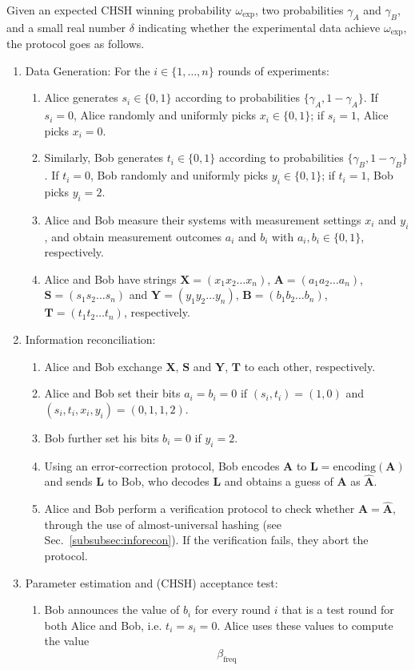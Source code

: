 \documentclass[aps,reprint,showpacs,superscriptaddress]{revtex4-2}
\begin{document}
Given an expected CHSH winning probability $\omega_{\mathrm{exp}}$, two probabilities $\gamma_{A}$ and $\gamma_{B}$, and a small real number $\delta$ indicating whether the experimental data achieve $\omega_{\mathrm{exp}}$, the protocol goes as follows.
\begin{enumerate}
	\item Data Generation:
	For the $i\in\{1,\dots,n\}$ rounds of experiments:
	\begin{enumerate}
		\item Alice generates $s_{i}\in\{0,1\}$ according to probabilities $\{\gamma_{A},1-\gamma_{A}\}$. If $s_{i}=0$, Alice randomly and uniformly picks $x_{i}\in\{0,1\}$; if $s_{i}=1$, Alice picks $x_{i}=0$.
		\item Similarly, Bob generates $t_{i}\in\{0,1\}$ according to probabilities $\{\gamma_{B},1-\gamma_{B}\}$. If $t_{i}=0$, Bob randomly and uniformly picks $y_{i}\in\{0,1\}$; if $t_{i}=1$, Bob picks $y_{i}=2$.
		\item Alice and Bob measure their systems with measurement settings $x_{i}$ and $y_{i}$, and obtain measurement outcomes $a_{i}$ and $b_{i}$ with $a_{i},b_{i}\in\{0,1\}$, respectively.
		\item Alice and Bob have strings $\mathbf{X}=(x_{1}x_{2}\dots x_{n})$, $\mathbf{A}=(a_{1}a_{2}\dots a_{n})$, $\mathbf{S}=(s_{1}s_{2}\dots s_{n})$ and $\mathbf{Y}=(y_{1}y_{2}\dots y_{n})$, $\mathbf{B}=(b_{1}b_{2}\dots b_{n})$,  $\mathbf{T}=(t_{1}t_{2}\dots t_{n})$, respectively.
	\end{enumerate}
	\item Information reconciliation:
	\begin{enumerate}
		\item Alice and Bob exchange $\mathbf{X}$, $\mathbf{S}$ and $\mathbf{Y}$, $\mathbf{T}$ to each other, respectively.
		\item Alice and Bob set their bits $a_{i}=b_{i}=0$ if $(s_{i}, t_{i})=(1,0)$ and $(s_{i},t_{i},x_{i},y_{i})=(0,1,1,2)$.
		\item Bob further set his bits $b_{i}=0$ if $y_{i}=2$.
		\item Using an error-correction protocol, Bob encodes $\mathbf{A}$ to $\mathbf{L}=\mathrm{encoding}(\mathbf{A})$ and sends $\mathbf{L}$ to Bob, who decodes $\mathbf{L}$ and obtains a guess of $\mathbf{A}$ as $\hat{\mathbf{A}}$.
		\item Alice and Bob perform a verification protocol to check whether $\mathbf{A} = \hat{\mathbf{A}}$, through the use of almost-universal hashing (see Sec.~\ref{subsubsec:inforecon}). If the verification fails, they abort the protocol.
	\end{enumerate}
	\item Parameter estimation and (CHSH) acceptance test:
	\begin{enumerate}
		\item Bob announces the value of $b_i$ for every round $i$ that is a test round for both Alice and Bob, i.e. $t_{i}=s_{i}=0$. Alice uses these values to compute the value
		\begin{equation}
		\beta_\mathrm{freq}


\end{equation}
\end{enumerate}
\end{enumerate}
\end{document}
